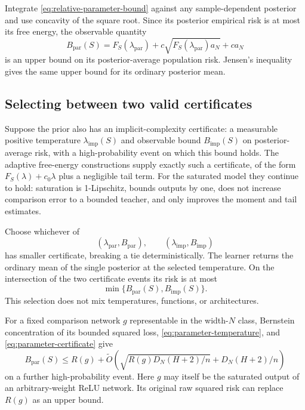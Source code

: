Integrate \eqref{eq:relative-parameter-bound} against any sample-dependent posterior and use concavity of the square root. Since its posterior empirical risk is at most its free energy, the observable quantity
\begin{equation}
 B_{\mathrm{par}}(S)=F_S(\lambda_{\mathrm{par}})
 +c\sqrt{F_S(\lambda_{\mathrm{par}})a_N}+ca_N
 \label{eq:parameter-certificate}
\end{equation}
is an upper bound on its posterior-average population risk. Jensen's inequality gives the same upper bound for its ordinary posterior mean.

\subsection{Selecting between two valid certificates}
Suppose the prior also has an implicit-complexity certificate: a measurable positive temperature $\lambda_{\mathrm{imp}}(S)$ and observable bound $B_{\mathrm{imp}}(S)$ on posterior-average risk, with a high-probability event on which this bound holds. The adaptive free-energy constructions supply exactly such a certificate, of the form $F_S(\lambda)+c_0\lambda$ plus a negligible tail term. For the saturated model they continue to hold: saturation is 1-Lipschitz, bounds outputs by one, does not increase comparison error to a bounded teacher, and only improves the moment and tail estimates.

Choose whichever of
\[
 (\lambda_{\mathrm{par}},B_{\mathrm{par}}),\qquad
 (\lambda_{\mathrm{imp}},B_{\mathrm{imp}})
\]
has smaller certificate, breaking a tie deterministically. The learner returns the ordinary mean of the single posterior at the selected temperature. On the intersection of the two certificate events its risk is at most
\begin{equation}
 \min\{B_{\mathrm{par}}(S),B_{\mathrm{imp}}(S)\}.
 \label{eq:minimum-certificates}
\end{equation}
This selection does not mix temperatures, functions, or architectures.

For a fixed comparison network $g$ representable in the width-$N$ class, Bernstein concentration of its bounded squared loss, \eqref{eq:parameter-temperature}, and \eqref{eq:parameter-certificate} give
\begin{equation}
 B_{\mathrm{par}}(S)
 \le R(g)+\widetilde O\left(\sqrt{R(g)D_N(H+2)/n}
                          +D_N(H+2)/n\right)
 \label{eq:parameter-comparison}
\end{equation}
on a further high-probability event. Here $g$ may itself be the saturated output of an arbitrary-weight ReLU network. Its original raw squared risk can replace $R(g)$ as an upper bound.

